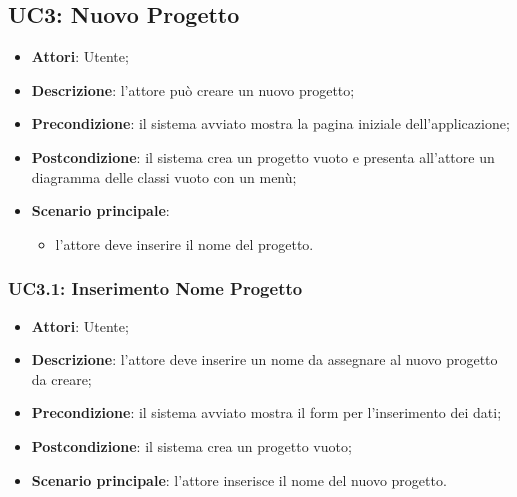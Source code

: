 \subsection{UC3: Nuovo Progetto}
\label{UC3}
\begin{itemize}
	\item \textbf{Attori}: Utente;
	\item \textbf{Descrizione}: l'attore può creare un nuovo progetto;
	\item \textbf{Precondizione}: il sistema avviato mostra la pagina iniziale dell'applicazione;
	\item \textbf{Postcondizione}: il sistema crea un progetto vuoto e presenta all'attore un diagramma delle classi vuoto con un menù;
	\item \textbf{Scenario principale}:
	\begin{itemize} %
		\item l'attore deve inserire il nome del progetto.
	\end{itemize}
\end{itemize}

\subsubsection{UC3.1: Inserimento Nome Progetto}
\label{UC3.1}
\begin{itemize}
	\item \textbf{Attori}: Utente;
	\item \textbf{Descrizione}: l'attore deve inserire un nome da assegnare al nuovo progetto da creare;
	\item \textbf{Precondizione}: il sistema avviato mostra il form per l'inserimento dei dati;
	\item \textbf{Postcondizione}: il sistema crea un progetto vuoto;
	\item \textbf{Scenario principale}: l'attore inserisce il nome del nuovo progetto.
\end{itemize}

